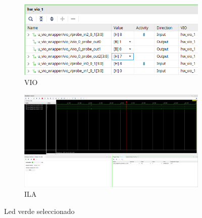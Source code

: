 \begin{figure}[H]
    \centering
    \begin{subfigure}{0.5\textwidth}
        \includegraphics[width=\textwidth]{captures/impl_c1_led_green_vio.png}
        \caption{VIO}
    \end{subfigure}

    \vspace{1cm}

    \begin{subfigure}{\textwidth}
        \includegraphics[width=\textwidth]{captures/impl_c1_led_green_ila.png}
        \caption{ILA}
    \end{subfigure}

    \caption{Led verde seleccionado}
\end{figure}

\newpage

